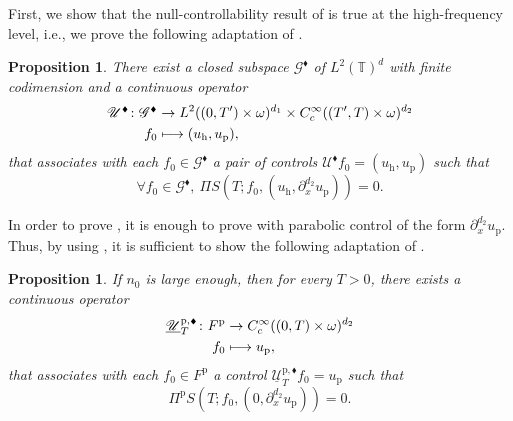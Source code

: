 \documentclass[11pt]{article}
\newcommand{\ie}{i.e.,\xspace}
\let\mathcal\mathscr
\def\mto{\mathchoice{\longmapsto}{\mapsto}{\mapsto}{\mapsto}}
\newcommand{\sblacklozenge}{{\scriptscriptstyle \blacklozenge}}
\theoremstyle{plain}
\newtheorem{prop}[theorem]{Proposition}
\theoremstyle{definition}
\theoremstyle{remark}
\newcommand{\set}{\mathbb}
\newcommand{\T}{\set{T}}
\newcommand{\h}{{\mathrm h}}
\newcommand{\p}{{\mathrm p}}
\begin{document}
First, we show that the null-controllability result of  is true at the high-frequency level, \ie we prove the following adaptation of .
\begin{prop}
\label{PropControlHighFreqd_x}
There exist a closed subspace $\mathcal{G}^{\sblacklozenge}$ of $L^2(\T)^{d}$ with finite codimension and a continuous operator
\begin{align*}
\mathcal{U}^{\sblacklozenge} \colon
\mathcal{G}^{\sblacklozenge} &\to L^2((0,T')\times\omega)^{d_1} \times C^\infty_c((T',T)\times\omega)^{d_2}\\
f_0 &\mto (u_{\h},u_{\p}),
\end{align*}
that associates with each $f_0 \in \mathcal{G}^{\sblacklozenge} $ a pair of controls $\mathcal{U}^{\sblacklozenge} f_{0}=(u_{\h},u_{\p})$ such that
\begin{equation}
\label{PropKd_x}
\forall f_0 \in \mathcal{G}^{\sblacklozenge},\ \Pi S(T;f_0, (u_{\h},\partial_{x}^{d_2}u_{\p})) = 0.
\end{equation}
\end{prop}
In order to prove , it is enough to prove  with
parabolic control of the form $\partial_{x}^{d_2} u_{\p}$. Thus, by using
, it is sufficient to show the following adaptation of
.
\begin{prop}
\label{LemPar_Bisd_x}
If $n_0$ is large enough, then for every $T>0$, there exists a continuous operator
\begin{align*}
\underline{\mathcal{U}}_T^{\p,\sblacklozenge} \colon
F^\p & \to C^\infty_c((0,T)\times\omega)^{d_2} \\
f_0 &\mto u_{\p},
\end{align*}
that associates with each $f_0 \in F^{\p} $ a control $\underline{\mathcal{U}}_T^{\p,\sblacklozenge} f_{0}=u_{\p}$ such that
\begin{equation*}
\Pi^{\p} S(T; f_0, (0, \partial_{x}^{d_2}u_{\p})) = 0.
\end{equation*}
\end{prop}
\end{document}
